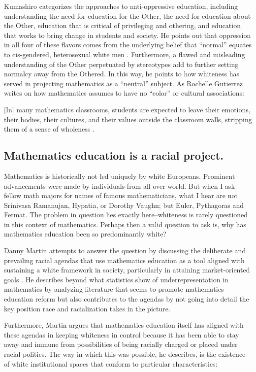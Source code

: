 Kumashiro categorizes the approaches to anti-oppressive education, including understanding the need for education for the Other, the need for education about the Other, education that is critical of privileging and othering, and education that works to bring change in students and society. He points out that oppression in all four of these flavors comes from the underlying belief that ``normal'' equates to cis-gendered, heterosexual white men \citep{kumashiro_toward_2000}. Furthermore, a flawed and misleading understanding of the Other perpetuated by stereotypes add to further setting normalcy away from the Othered. In this way, he points to how whiteness has served in projecting mathematics as a ``neutral'' subject. As Rochelle Gutierrez writes on how mathematics assumes to have no ``color'' or cultural associations:
\begin{displayquote}
  {[In]} many mathematics classrooms, students are expected to leave their emotions, their bodies, their cultures, and their values outside the classroom walls, stripping them of a sense of wholeness \citep{gutierrez_embracing_2012}.
\end{displayquote}

\subsection{Mathematics education is a racial project.}
Mathematics is historically not led uniquely by white Europeans. Prominent advancements were made by individuals from all over world. But when I ask fellow math majors for names of famous mathematicians, what I hear are not Srinivasa Ramanujan, Hypatia, or Dorothy Vaughn; but Euler, Pythagoras and Fermat. The problem in question lies exactly here--whiteness is rarely questioned in this context of mathematics. Perhaps then a valid question to ask is, why has mathematics education been so predominantly white?

Danny Martin attempts to answer the question by discussing the deliberate and prevailing racial agendas that use mathematics education as a tool aligned with sustaining a white framework in society, particularly in attaining market-oriented goals \citep{martin_race_2013}. He describes beyond what statistics show of underrepresentation in mathematics by analyzing literature that seems to promote mathematics education reform but also contributes to the agendas by not going into detail the key position race and racialization takes in the picture.

Furthermore, Martin argues that mathematics education itself has aligned with these agendas in keeping whiteness in control because it has been able to stay away and immune from possibilities of being racially charged or placed under racial politics. The way in which this was possible, he describes, is the existence of white institutional spaces that conform to particular characteristics:

